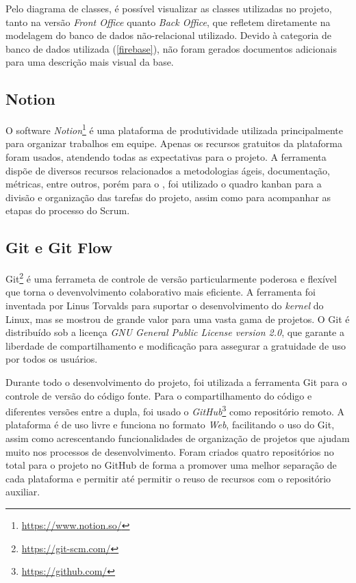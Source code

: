 
Pelo diagrama de classes, é possível visualizar as classes utilizadas no projeto, tanto na versão \textit{Front Office} quanto \textit{Back Office}, que refletem diretamente na modelagem do banco de dados não-relacional utilizado. Devido à categoria de banco de dados utilizada (\ref{firebase}), não foram gerados documentos adicionais para uma descrição mais visual da base.

\subsection{Notion}
\label{notion}

O software \textit{Notion}\footnote{\url{https://www.notion.so/}} é uma plataforma de produtividade utilizada principalmente para organizar trabalhos em equipe. Apenas os recursos gratuitos da plataforma foram usados, atendendo todas as expectativas para o projeto. A ferramenta dispõe de diversos recursos relacionados a metodologias ágeis, documentação, métricas, entre outros, porém para o \appName, foi utilizado o quadro kanban para a divisão e organização das tarefas do projeto, assim como para acompanhar as etapas do processo do Scrum.

\subsection{Git e Git Flow}
\label{git}

Git\footnote{\url{https://git-scm.com/}} \cite{git} é uma ferrameta de controle de versão particularmente poderosa e flexível que torna o devenvolvimento colaborativo mais eficiente. A ferramenta foi inventada por Linus Torvalds para suportar o desenvolvimento do \textit{kernel} do Linux, mas se mostrou de grande valor para uma vasta gama de projetos. O Git é distribuído sob a licença \textit{GNU General Public License version 2.0}, que garante a liberdade de compartilhamento e modificação para assegurar a gratuidade de uso por todos os usuários.

Durante todo o desenvolvimento do projeto, foi utilizada a ferramenta Git para o controle de versão do código fonte. Para o compartilhamento do código e diferentes versões entre a dupla, foi usado o \textit{GitHub}\footnote{\url{https://github.com/}} como repositório remoto. A plataforma é de uso livre e funciona no formato \textit{Web}, facilitando o uso do Git, assim como acrescentando funcionalidades de organização de projetos que ajudam muito nos processos de desenvolvimento. Foram criados quatro repositórios no total para o projeto no GitHub de forma a promover uma melhor separação de cada plataforma e permitir até permitir o reuso de recursos com o repositório auxiliar.

